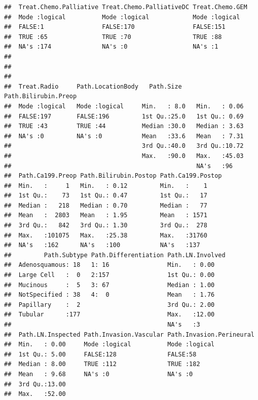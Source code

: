 \documentclass{article}\usepackage[]{graphicx}\usepackage[]{color}
\makeatletter
\newenvironment{kframe}{%
 \def\at@end@of@kframe{}%
 \ifinner\ifhmode%
  \def\at@end@of@kframe{\end{minipage}}%
  \begin{minipage}{\columnwidth}%
 \fi\fi%
 \def\FrameCommand##1{\hskip\@totalleftmargin \hskip-\fboxsep
 \colorbox{shadecolor}{##1}\hskip-\fboxsep
     \hskip-\linewidth \hskip-\@totalleftmargin \hskip\columnwidth}%
 \MakeFramed {\advance\hsize-\width
   \@totalleftmargin\z@ \linewidth\hsize
   \@setminipage}}%
 {\par\unskip\endMakeFramed%
 \at@end@of@kframe}
\newenvironment{knitrout}{}{} %
\makeatother
\begin{document}
\begin{knitrout}
\begin{kframe}
\begin{verbatim}
##  Treat.Chemo.Palliative Treat.Chemo.PalliativeDC Treat.Chemo.GEM
##  Mode :logical          Mode :logical            Mode :logical  
##  FALSE:1                FALSE:170                FALSE:151      
##  TRUE :65               TRUE :70                 TRUE :88       
##  NA's :174              NA's :0                  NA's :1        
##                                                                 
##                                                                 
##                                                                 
##  Treat.Radio     Path.LocationBody   Path.Size    Path.Bilirubin.Preop
##  Mode :logical   Mode :logical     Min.   : 8.0   Min.   : 0.06       
##  FALSE:197       FALSE:196         1st Qu.:25.0   1st Qu.: 0.69       
##  TRUE :43        TRUE :44          Median :30.0   Median : 3.63       
##  NA's :0         NA's :0           Mean   :33.6   Mean   : 7.31       
##                                    3rd Qu.:40.0   3rd Qu.:10.72       
##                                    Max.   :90.0   Max.   :45.03       
##                                                   NA's   :96          
##  Path.Ca199.Preop Path.Bilirubin.Postop Path.Ca199.Postop
##  Min.   :     1   Min.   : 0.12         Min.   :    1    
##  1st Qu.:    73   1st Qu.: 0.47         1st Qu.:   17    
##  Median :   218   Median : 0.70         Median :   77    
##  Mean   :  2803   Mean   : 1.95         Mean   : 1571    
##  3rd Qu.:   842   3rd Qu.: 1.30         3rd Qu.:  278    
##  Max.   :101075   Max.   :25.38         Max.   :31760    
##  NA's   :162      NA's   :100           NA's   :137      
##         Path.Subtype Path.Differentiation Path.LN.Involved
##  Adenosquamous: 18   1: 16                Min.   : 0.00   
##  Large Cell   :  0   2:157                1st Qu.: 0.00   
##  Mucinous     :  5   3: 67                Median : 1.00   
##  NotSpecified : 38   4:  0                Mean   : 1.76   
##  Papillary    :  2                        3rd Qu.: 2.00   
##  Tubular      :177                        Max.   :12.00   
##                                           NA's   :3       
##  Path.LN.Inspected Path.Invasion.Vascular Path.Invasion.Perineural
##  Min.   : 0.00     Mode :logical          Mode :logical           
##  1st Qu.: 5.00     FALSE:128              FALSE:58                
##  Median : 8.00     TRUE :112              TRUE :182               
##  Mean   : 9.68     NA's :0                NA's :0                 
##  3rd Qu.:13.00                                                    
##  Max.   :52.00                                                    

\end{verbatim}
\end{kframe}
\end{knitrout}
\end{document}
